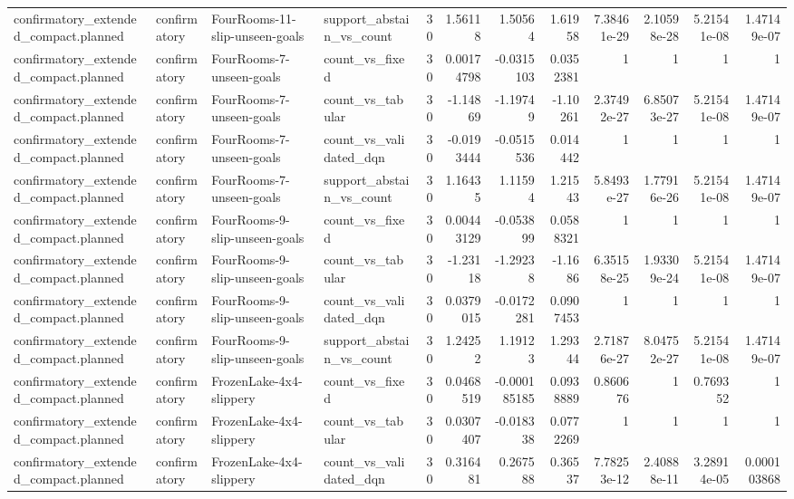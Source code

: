 \begin{longtable}{llllrrrrrrrr}
confirmatory\_extended\_compact.planned & confirmatory & FourRooms-11-slip-unseen-goals & support\_abstain\_vs\_count & 30 & 1.56118 & 1.50564 & 1.61958 & 7.38461e-29 & 2.10598e-28 & 5.21541e-08 & 1.47149e-07 \\
confirmatory\_extended\_compact.planned & confirmatory & FourRooms-7-unseen-goals & count\_vs\_fixed & 30 & 0.00174798 & -0.0315103 & 0.0352381 & 1 & 1 & 1 & 1 \\
confirmatory\_extended\_compact.planned & confirmatory & FourRooms-7-unseen-goals & count\_vs\_tabular & 30 & -1.14869 & -1.19749 & -1.10261 & 2.37492e-27 & 6.85073e-27 & 5.21541e-08 & 1.47149e-07 \\
confirmatory\_extended\_compact.planned & confirmatory & FourRooms-7-unseen-goals & count\_vs\_validated\_dqn & 30 & -0.0193444 & -0.0515536 & 0.014442 & 1 & 1 & 1 & 1 \\
confirmatory\_extended\_compact.planned & confirmatory & FourRooms-7-unseen-goals & support\_abstain\_vs\_count & 30 & 1.16435 & 1.11594 & 1.21543 & 5.8493e-27 & 1.77916e-26 & 5.21541e-08 & 1.47149e-07 \\
confirmatory\_extended\_compact.planned & confirmatory & FourRooms-9-slip-unseen-goals & count\_vs\_fixed & 30 & 0.00443129 & -0.053899 & 0.0588321 & 1 & 1 & 1 & 1 \\
confirmatory\_extended\_compact.planned & confirmatory & FourRooms-9-slip-unseen-goals & count\_vs\_tabular & 30 & -1.23118 & -1.29238 & -1.1686 & 6.35158e-25 & 1.93309e-24 & 5.21541e-08 & 1.47149e-07 \\
confirmatory\_extended\_compact.planned & confirmatory & FourRooms-9-slip-unseen-goals & count\_vs\_validated\_dqn & 30 & 0.0379015 & -0.0172281 & 0.0907453 & 1 & 1 & 1 & 1 \\
confirmatory\_extended\_compact.planned & confirmatory & FourRooms-9-slip-unseen-goals & support\_abstain\_vs\_count & 30 & 1.24252 & 1.19123 & 1.29344 & 2.71876e-27 & 8.04752e-27 & 5.21541e-08 & 1.47149e-07 \\
confirmatory\_extended\_compact.planned & confirmatory & FrozenLake-4x4-slippery & count\_vs\_fixed & 30 & 0.0468519 & -0.000185185 & 0.0938889 & 0.860676 & 1 & 0.769352 & 1 \\
confirmatory\_extended\_compact.planned & confirmatory & FrozenLake-4x4-slippery & count\_vs\_tabular & 30 & 0.0307407 & -0.018338 & 0.0772269 & 1 & 1 & 1 & 1 \\
confirmatory\_extended\_compact.planned & confirmatory & FrozenLake-4x4-slippery & count\_vs\_validated\_dqn & 30 & 0.316481 & 0.267588 & 0.36537 & 7.78253e-12 & 2.40888e-11 & 3.28914e-05 & 0.000103868 \\

\end{longtable}
